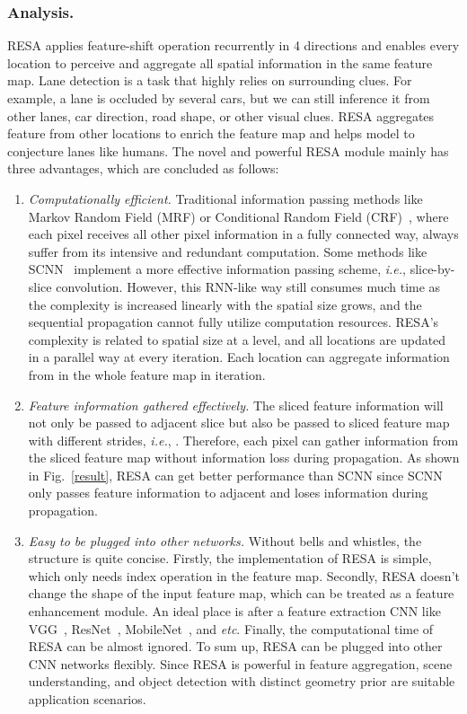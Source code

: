 \documentclass[letterpaper]{article} \usepackage{aaai21}  \usepackage{times}  \usepackage{helvet} \usepackage{courier}  \usepackage[hyphens]{url}  \usepackage{graphicx} \urlstyle{rm} \def\UrlFont{\rm}  \usepackage{natbib}  \usepackage{caption} \frenchspacing  \setlength{\pdfpagewidth}{8.5in}  \setlength{\pdfpageheight}{11in}  \usepackage{amsmath}
\begin{document}
\subsubsection{Analysis.}
RESA applies feature-shift operation recurrently in 4 directions and enables every location to perceive and aggregate all spatial information in the same feature map. Lane detection is a task that highly relies on surrounding clues. For example, a lane is occluded by several cars, but we can still inference it from other lanes, car direction, road shape, or other visual clues. RESA aggregates feature from other locations to enrich the feature map and helps model to conjecture lanes like humans. The novel and powerful RESA module mainly has three advantages, which are concluded as follows:

\begin{enumerate}
    \item \textit{Computationally efficient.} Traditional information passing methods like Markov Random Field (MRF) or Conditional Random Field (CRF)~\citep{NIPS2011_4296}, where each pixel receives all other pixel information in a fully connected way, always suffer from its intensive and redundant computation. Some methods like SCNN~\citep{pan2018spatial} implement a more effective information passing scheme, \emph{i.e.}, slice-by-slice convolution. However, this RNN-like way still consumes much time as the complexity is increased linearly with the spatial size grows, and the sequential propagation cannot fully utilize computation resources. RESA's complexity is related to spatial size at a  level, and all locations are updated in a parallel way at every iteration. Each location can aggregate information from in the whole feature map in  iteration.
    
    \item \textit{Feature information gathered effectively.} The sliced feature information will not only be passed to adjacent slice but also be passed to sliced feature map with different strides, \emph{i.e.}, . Therefore, each pixel can gather information from the sliced feature map without information loss during propagation. As shown in Fig.~\ref{result}, RESA can get better performance than SCNN since SCNN only passes feature information to adjacent and loses information during propagation.
    
    \item \textit{Easy to be plugged into other networks.} Without bells and whistles, the structure is quite concise. Firstly, the implementation of RESA is simple, which only needs index operation in the feature map. Secondly, RESA doesn't change the shape of the input feature map, which can be treated as a feature enhancement module. An ideal place is after a feature extraction CNN like VGG~\citep{simonyan2014very}, ResNet~\citep{he2016deep}, MobileNet~\citep{Howard2017MobileNetsEC}, and \emph{etc}. Finally, the computational time of RESA can be almost ignored. To sum up, RESA can be plugged into other CNN networks flexibly.  Since RESA is powerful in feature aggregation, scene understanding, and object detection with distinct geometry prior are suitable application scenarios.
\end{enumerate}
    
\end{document}
